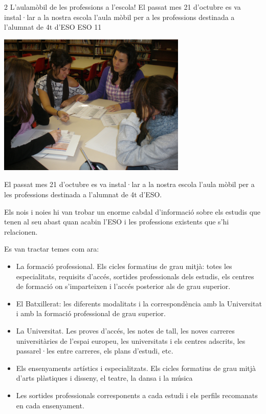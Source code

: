 \begin{news}
{2} %
{L'aulamòbil de les professions a l'escola!}
{El passat mes 21 d’octubre es va instal·lar a la nostra escola l’aula mòbil per a les professions destinada a l’alumnat de 4t d’ESO}
{ESO}
{11} %

\noindent\includegraphics[width=9cm,keepaspectratio]{eso/img/Aulamobil3.JPG}

El passat mes 21 d’octubre es va instal·lar a la nostra escola l’aula mòbil per a les professions destinada a l’alumnat de 4t d’ESO.

Els nois i noies hi van trobar un enorme cabdal d’informació sobre els estudis que tenen al seu abast quan acabin l’ESO i les professions existents que s’hi relacionen.

Es van tractar temes com ara:

\begin{itemize}

	\item La formació professional. Els cicles formatius de grau mitjà: totes les especialitats, requisits d’accés, sortides professionals dels estudis, els centres de formació on s’imparteixen i l’accés posterior als de grau superior.

	\item El Batxillerat: les diferents modalitats i la correspondència amb la Universitat i amb la formació professional de grau superior.

	\item La Universitat. Les proves d’accés, les notes de tall, les noves carreres universitàries de l’espai europeu, les universitats i els centres adscrits, les passarel·les entre carreres, els plans d’estudi, etc.

	\item Els ensenyaments artístics i especialitzats. Els cicles formatius de grau mitjà d’arts plàstiques i disseny, el teatre, la dansa i la música

	\item Les sortides professionals corresponents a cada estudi i els perfils recomanats en cada ensenyament. 

\end{itemize}

\end{news}
